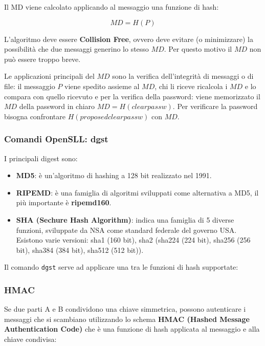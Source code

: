             Il MD viene calcolato applicando al messaggio una funzione di hash:

            \begin{equation*}
                MD = H(P)
            \end{equation*}

            L'algoritmo deve essere \textbf{Collision Free}, ovvero deve evitare (o minimizzare) la possibilità che due messaggi generino lo stesso $MD$. Per questo motivo il $MD$ non può essere troppo breve.

            Le applicazioni principali del $MD$ sono la verifica dell'integrità di messaggi o di file: il messaggio $P$ viene spedito assieme al $MD$, chi li riceve ricalcola i $MD$ e lo compara con quello ricevuto e per la verifica della password: viene memorizzato il $MD$ della password in chiaro $MD = H(clear passw)$. Per verificare la password bisogna confrontare $H(proposed clear passw)$ con $MD$.

        \subsubsection{Comandi OpenSLL: dgst}
            I principali digest sono:
            \begin{itemize}
                \item \textbf{MD5}: è un'algoritmo di hashing a 128 bit realizzato nel 1991.
                \item \textbf{RIPEMD}: è una famiglia di algoritmi sviluppati come alternativa a MD5, il più importante è \textbf{ripemd160}.
                \item \textbf{SHA (Sechure Hash Algorithm)}: indica una famiglia di 5 diverse funzioni, sviluppate da NSA come standard federale del governo USA. Esistono varie versioni: sha1 (160 bit), sha2 (sha224 (224 bit), sha256 (256 bit), sha384 (384 bit), sha512 (512 bit)).
            \end{itemize}

            Il comando \verb|dgst| serve ad applicare una tra le funzioni di hash supportate:

            

        \subsubsection{HMAC}
            Se due parti A e B condividono una chiave simmetrica, possono autenticare i messaggi che si scambiano utilizzando lo schema \textbf{HMAC (Hashed Message Authentication Code)} che è una funzione di hash applicata al messaggio e alla chiave condivisa:
            
